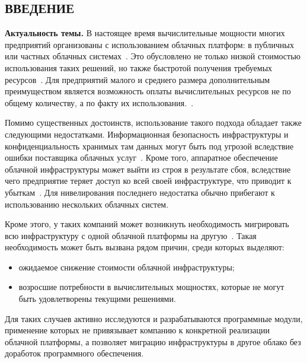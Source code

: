 \begin{center}
\section*{ВВЕДЕНИЕ}
\end{center}
\textbf{Актуальность темы.}
В настоящее время вычислительные мощности многих предприятий организованы с использованием облачных платформ: в публичных или частных облачных системах~\cite{fake-11, fake-15}.
Это обусловлено не только низкой стоимостью использования таких решений, но также быстротой получения требуемых ресурсов~\cite{fake-14}.
Для предприятий малого и среднего размера дополнительным преимуществом является возможность оплаты вычислительных ресурсов не по общему количеству, а по факту их использования.~\cite{fake-13}.

Помимо существенных достоинств, использование такого подхода обладает также следующими недостатками. 
Информационная безопасность инфраструктуры и конфиденциальность хранимых там данных могут быть под угрозой вследствие ошибки поставщика облачных услуг~\cite{fake-34}.
Кроме того, аппаратное обеспечение облачной инфраструктуры может выйти из строя в результате сбоя, вследствие чего предприятие теряет доступ ко всей своей инфраструктуре, что приводит к убыткам~\cite{fake-37}.
Для нивелирования последнего недостатка обычно прибегают к использованию нескольких облачных систем.


Кроме этого, у таких компаний может возникнуть необходимость мигрировать всю инфраструктуру с одной облачной платформы на другую~\cite{fake-21}.
Такая необходимость может быть вызвана рядом причин, среди которых выделяют:
\begin{itemize}
    \item ожидаемое снижение стоимости облачной инфраструктуры;
    \item возросшие потребности в вычислительных мощностях, которые не могут быть удовлетворены текущими решениями.
\end{itemize}
Для таких случаев активно исследуются и разрабатываются программные модули, применение которых не привязывает компанию к конкретной реализации облачной платформы, а позволяет миграцию инфраструктуры в другое облако без доработок программного обеспечения.

